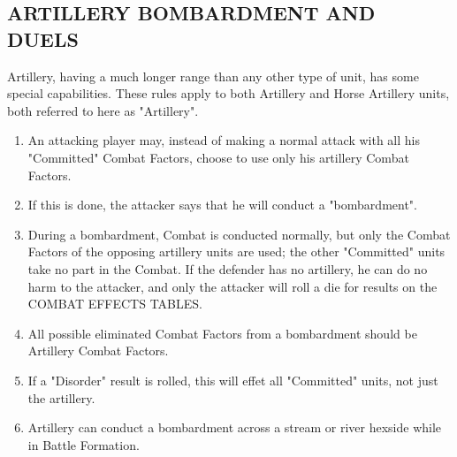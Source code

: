 \subsection{ARTILLERY BOMBARDMENT AND DUELS}

Artillery, having a much longer range than any other type of unit, has some special capabilities. These rules apply to both Artillery and Horse Artillery units, both referred to here as "Artillery".

\begin{enumerate}[label=(\alph*)]
  \item An attacking player may, instead of making a normal attack with all his "Committed" Combat Factors, choose to use only his artillery Combat Factors.

  \item If this is done, the attacker says that he will conduct a "bombardment".

  \item During a bombardment, Combat is conducted normally, but only the Combat Factors of the opposing artillery units are used; the other "Committed" units take no part in the Combat. If the defender has no artillery, he can do no harm to the attacker, and only the attacker will roll a die for results on the COMBAT EFFECTS TABLES.

  \item All possible eliminated Combat Factors from a bombardment should be Artillery Combat Factors.

  \item If a "Disorder" result is rolled, this will effet all "Committed" units, not just the artillery.

  \item Artillery can conduct a bombardment across a stream or river hexside while in Battle Formation.
\end{enumerate}